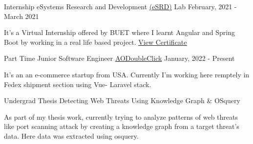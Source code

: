 \documentclass[]{awesome-cv}
\begin{document}
\begin{cventries}
	\cventry
	{Internship}
	{eSystems Research and Development \href{http://vinternship.org/}{\underline{(eSRD)}} Lab}
	{February, 2021 - March 2021}
	{}
	{\begin{cvitems}
			\item { It's a Virtual Internship offered by BUET where I learnt Angular and Spring Boot by working in a real life based project.  \href{https://drive.google.com/drive/u/0/folders/1sx3UMH5gBBTkda5ivJqcNqGb4bhuACwu}{\underline{View Certificate}} } \end{cvitems}}
	\cventry
	{Part Time Junior Software Engineer} 
	{\href{https://aodoubleclick.com/}{\underline{AODoubleClick}}}
	{January, 2022 - Present}
	{}
	{ \begin{cvitems} %
			\item { It's an an e-commerce startup from USA. Currently I'm working here remptely in Fedex shipment section using Vue- Laravel stack.  } \end{cvitems} }
\end{cventries}

\vspace{-4mm}

\begin{cventries}
	\cventry
	{Undergrad Thesis}
	{Detecting Web Threats Using Knowledge Graph \& OSquery}
	{}
	{}
	{\begin{cvitems}
			\item {As part of my thesis work, currently trying to analyze patterns of web threats like port scanning attack by creating a knowledge graph from a target threat's data. Here data was extracted using osquery. }
	\end{cvitems}}
\end{cventries}

\vspace{-4mm}

\end{document}
